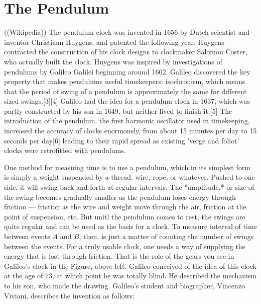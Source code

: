 \section{The Pendulum}



((Wikipedia)) The pendulum clock was invented in 1656 by Dutch scientist and inventor Christiaan Huygens, and patented the following year. Huygens contracted the construction of his clock designs to clockmaker Salomon Coster, who actually built the clock. Huygens was inspired by investigations of pendulums by Galileo Galilei beginning around 1602. Galileo discovered the key property that makes pendulums useful timekeepers: isochronism, which means that the period of swing of a pendulum is approximately the same for different sized swings.[3][4] Galileo had the idea for a pendulum clock in 1637, which was partly constructed by his son in 1649, but neither lived to finish it.[5] The introduction of the pendulum, the first harmonic oscillator used in timekeeping, increased the accuracy of clocks enormously, from about 15 minutes per day to 15 seconds per day[6] leading to their rapid spread as existing 'verge and foliot' clocks were retrofitted with pendulums. 


One method for measuing time is to use a pendulum, which in its simplest form is simply a weight suspended by a thread. wire, rope, or whatever.  Pushed to one side, it will swing back and forth at regular intervals.  The *amplitude,* or size of the swing  becomes gradually smaller as the pendulum loses energy through friction — friction as the wire and weight move through the air, friction at the point of suspension, etc.  But unitl the pendulum comes to rest, the swings are quite regular and can be used as the basis for a clock. To measure interval of time between events $A$ and $B$, then, is just a matter of counting the number of swings between the events.   For a truly usable clock, one needs a way of supplying the energy that is lost through friction.  That is the role of the gears you see in Galileo's clock in the Figure, above left.  Galileo conceived of the idea of this clock at the age of 73, at which point he was totally blind. He described the mechanism to his son, who made the drawing.  Galileo's student and biographer, Vincenzo Viviani, describes the invention as follows:

